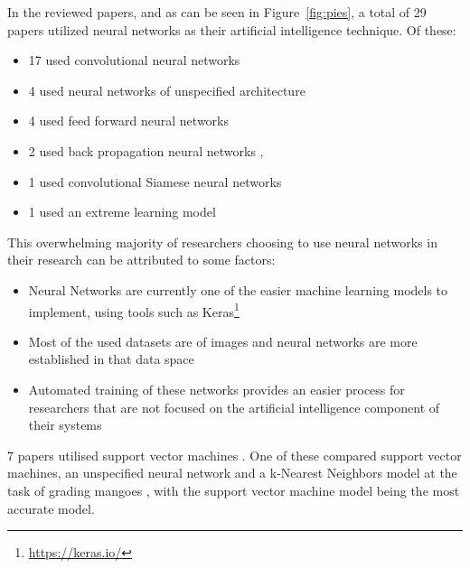 \documentclass[conference]{IEEEtran}
\begin{document}
In the reviewed papers, and as can be seen in Figure~\ref{fig:pies}, a total of 29 papers utilized neural networks as their artificial intelligence technique. Of these:

\begin{itemize}
	\item 17 used convolutional neural networks \cite{Pande2019-fz} \cite{Mohtar2019-ru} \cite{Saragih2021-wu} \cite{Al_Haque2021-fw} \cite{Tamayo-Monsalve2022-ud} \cite{Park2021-de} \cite{Stasenko2021-jt} \cite{Azizah2017} \cite{Hasan2021} \cite{MiraeiAshtiani2021} \cite{Basri2018} \cite{Kumar2021} \cite{GarillosManliguez2021} \cite{Shi2019} \cite{EAngelia2021} \cite{Bhole2020} \cite{Geng2021}
	\item 4 used neural networks of unspecified architecture \cite{Fadchar2020-pp} \cite{Anita2020-nm} \cite{Wagimin2022} \cite{Castro2019-hk}
	\item 4 used feed forward neural networks \cite{Choi2018-xp} \cite{Hamza2018-sc} \cite{Bautista2020-ye} \cite{Rangel2021}
	\item 2 used back propagation neural networks \cite{Nie2019-hx}, \cite{Muladi2019-jp}
	\item 1 used convolutional Siamese neural networks \cite{Annaland2020}
	\item 1 used an extreme learning model \cite{Lu2018}
\end{itemize}

This overwhelming majority of researchers choosing to use neural networks in their research can be attributed to some factors:

\begin{itemize}
	\item Neural Networks are currently one of the easier machine learning models to implement, using tools such as Keras\footnote{\url{https://keras.io/}}
	\item Most of the used datasets are of images and neural networks are more established in that data space
	\item Automated training of these networks provides an easier process for researchers that are not focused on the artificial intelligence component of their systems
\end{itemize}

7 papers utilised support vector machines \cite{Zeb2022} \cite{Tran2021} \cite{Indrabayu2019} \cite{Castro2019-hk} \cite{Prabhu2022-zh} \cite{Vo2019} \cite{Wagimin2022}. One of these compared support vector machines, an unspecified neural network and a k-Nearest Neighbors model at the task of grading mangoes \cite{Wagimin2022}, with the support vector machine model being the most accurate model.
\end{document}
